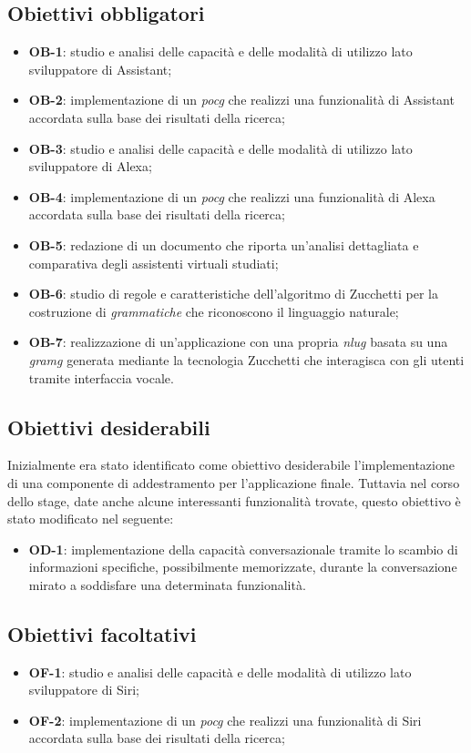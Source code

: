 	\subsection{Obiettivi obbligatori}
	\begin{itemize}
		\item \textbf{OB-1}: studio e analisi delle capacità e delle modalità di utilizzo lato sviluppatore di Assistant;
		\item \textbf{OB-2}: implementazione di un \emph{\gls{pocg}} che realizzi una funzionalità di Assistant accordata sulla base dei risultati della ricerca;
		\item \textbf{OB-3}: studio e analisi delle capacità e delle modalità di utilizzo lato sviluppatore di Alexa;
		\item \textbf{OB-4}: implementazione di un \emph{\gls{pocg}} che realizzi una funzionalità di Alexa accordata sulla base dei risultati della ricerca;
		\item \textbf{OB-5}: redazione di un documento che riporta un'analisi dettagliata e comparativa degli assistenti virtuali studiati;
		\item \textbf{OB-6}: studio di regole e caratteristiche dell'algoritmo di Zucchetti per la costruzione di \emph{grammatiche} che riconoscono il linguaggio naturale;
		\item \textbf{OB-7}: realizzazione di un'applicazione con una propria \emph{\gls{nlug}} basata su una \emph{\gls{gramg}} generata mediante la tecnologia Zucchetti che interagisca con gli utenti tramite interfaccia vocale.
	\end{itemize}
	\subsection{Obiettivi desiderabili}
	Inizialmente era stato identificato come obiettivo desiderabile l'implementazione di una componente di addestramento per l'applicazione finale. Tuttavia nel corso dello stage, date anche alcune interessanti funzionalità trovate, questo obiettivo è stato modificato nel seguente:
	\begin{itemize}
		\item \textbf{OD-1}: implementazione della capacità conversazionale tramite lo scambio di informazioni specifiche, possibilmente memorizzate, durante la conversazione mirato a soddisfare una determinata funzionalità.
	\end{itemize}
	\subsection{Obiettivi facoltativi}
	\begin{itemize}
		\item \textbf{OF-1}: studio e analisi delle capacità e delle modalità di utilizzo lato sviluppatore di Siri;
		\item \textbf{OF-2}: implementazione di un \emph{\gls{pocg}} che realizzi una funzionalità di Siri accordata sulla base dei risultati della ricerca;
	\end{itemize} 

